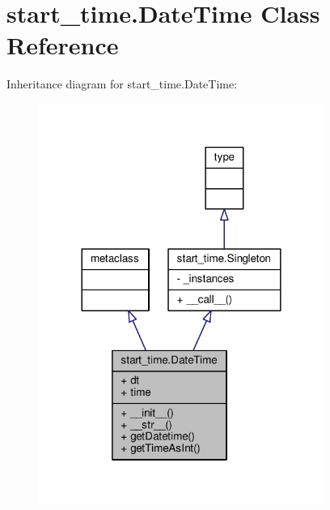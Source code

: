 \hypertarget{classstart__time_1_1_date_time}{}\section{start\+\_\+time.\+Date\+Time Class Reference}
\label{classstart__time_1_1_date_time}


Inheritance diagram for start\+\_\+time.\+Date\+Time\+:
\nopagebreak
\begin{figure}[H]
\begin{center}
\leavevmode
\includegraphics[width=264pt]{classstart__time_1_1_date_time__inherit__graph}
\end{center}
\end{figure}


